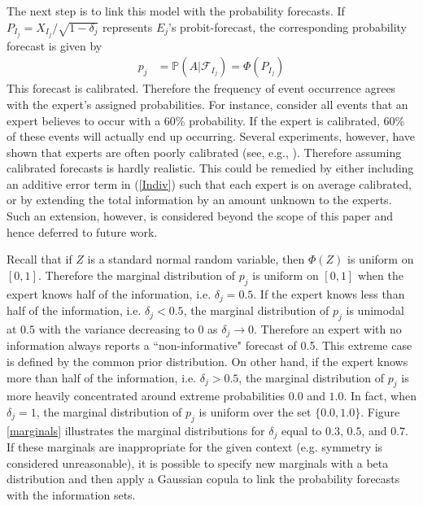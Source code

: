\documentclass[11pt]{article}
\renewcommand{\P}{\mathbb{P}}
\theoremstyle{definition}
\theoremstyle{definition}
\begin{document}
The next step is to link this model with the probability forecasts. If  $P_{I_j} = X_{I_j}/\sqrt{1-\delta_j}$ represents $E_j$'s probit-forecast, the corresponding probability forecast is given by
\begin{align}
p_j &= \P\left(A | \mathcal{F}_{I_j}\right) = \Phi\left( P_{I_j}\right) \label{Indiv}
\end{align}
This forecast is calibrated. Therefore the frequency of event occurrence agrees with the expert's assigned probabilities. For instance, consider all events that an expert believes to occur with a 60\% probability. If the expert is calibrated, 60\% of these events will actually end up occurring. Several experiments, however, have shown that experts are often poorly calibrated (see, e.g., \cite{cooke1991experts, shlyakhter1994quantifying}). Therefore assuming calibrated forecasts is hardly realistic. This could be remedied by  either including an additive error term in (\ref{Indiv}) such that each expert is on average calibrated, or by extending the total information by an amount unknown to the experts. Such an extension, however, is considered beyond the scope of this paper and hence deferred to future work. 

Recall that if $Z$ is a standard normal random variable, then $\Phi(Z)$ is uniform on $[0,1]$. Therefore the marginal distribution of $p_j$ is uniform on $[0,1]$ when the expert knows half of the information, i.e. $\delta_j = 0.5$. If the expert knows less than half of the information, i.e. $\delta_j < 0.5$, the marginal distribution of $p_j$ is unimodal at $0.5$ with the variance decreasing to 0 as $\delta_j \to 0$. Therefore an expert with no information always reports a ``non-informative" forecast of 0.5. This extreme case is defined by the common prior distribution. On other hand, if the expert knows more than half of the information, i.e. $\delta_j > 0.5$, the marginal  distribution of $p_j$ is more heavily concentrated around extreme probabilities $0.0$ and $1.0$. In fact, when $\delta_j = 1$, the marginal distribution of $p_j$ is uniform over the set $\{0.0,1.0\}$. Figure \ref{marginals} illustrates the marginal distributions for $\delta_j$ equal to $0.3$, $0.5$, and $0.7$. If these marginals are inappropriate for the given context (e.g. symmetry is considered unreasonable), it is possible to specify new marginals with a beta distribution and then apply a Gaussian copula to link the probability forecasts with the information sets. 
\end{document}
